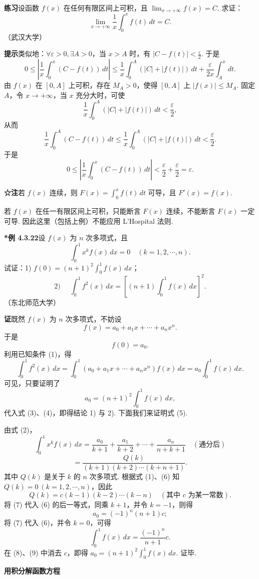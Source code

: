 \documentclass[UTF8, 12pt, fontset=fandol, oneside]{ctexart}
\begin{document}
\noindent\textbf{练习}\quad 设函数 $f(x)$ 在任何有限区间上可积，且 $\lim_{x\to+\infty}f(x)=C$. 求证：
\[
\lim_{x\to+\infty}\frac1x\int_0^x f(t)\,dt=C.
\]
（武汉大学）

\noindent\textbf{提示}\quad 类似地：$\forall\varepsilon>0,\exists A>0$，当 $x>A$ 时，有 $|C-f(t)|<\frac{\varepsilon}{2}$. 于是
\[
0\le\left|\frac1x\int_0^x(C-f(t))\,dt\right|
\le\frac1x\int_0^A(|C|+|f(t)|)\,dt+\frac{\varepsilon}{2x}\int_A^x dt.
\]
由 $f(x)$ 在 $[0,A]$ 上可积，存在 $M_A>0$，使得 $[0,A]$ 上 $|f(x)|\le M_A$. 固定 $A$，令 $x\to+\infty$，当 $x$ 充分大时，可使
\[
\frac1x\int_0^A(|C|+|f(t)|)\,dt<\frac{\varepsilon}{2},
\]
从而
\[
\frac1x\int_0^A(C-f(t))\,dt
\le\frac1x\int_0^A(|C|+|f(t)|)\,dt<\frac{\varepsilon}{2}.
\]
于是
\[
0\le\left|\frac1x\int_0^x(C-f(t))\,dt\right|
<\frac{\varepsilon}{2}+\frac{\varepsilon}{2}=\varepsilon.
\]

\noindent\textbf{☆注}\quad 若 $f(x)$ 连续，则 $F(x)=\int_0^x f(t)\,dt$ 可导，且 $F'(x)=f(x)$.

若 $f(x)$ 在任一有限区间上可积，只能断言 $F(x)$ 连续，不能断言 $F(x)$ 一定可导. 因此这里（包括上例）不能应用 L'Hospital 法则.

\noindent\textbf{*例 4.3.22}\quad 设 $f(x)$ 为 $n$ 次多项式，且
\[
\int_0^1 x^k f(x)\,dx=0\quad(k=1,2,\cdots,n).
\tag{1}
\]
试证：1) $f(0)=(n+1)^2\int_0^1 f(x)\,dx$；
\[
\text{2) }\quad
\int_0^1 f^2(x)\,dx
=\left[(n+1)\int_0^1 f(x)\,dx\right]^2.
\]
（东北师范大学）

\noindent\textbf{证}\quad 既然 $f(x)$ 为 $n$ 次多项式，不妨设
\[
f(x)=a_0+a_1x+\cdots+a_nx^n.
\tag{2}
\]
于是
\[
f(0)=a_0.
\tag{3}
\]
利用已知条件 (1)，得
\[
\int_0^1 f^2(x)\,dx
=\int_0^1(a_0+a_1x+\cdots+a_nx^n)f(x)\,dx
=a_0\int_0^1 f(x)\,dx.
\tag{4}
\]
可见，只要证明了
\[
a_0=(n+1)^2\int_0^1 f(x)\,dx,
\tag{5}
\]
代入式 (3)、(4)，即得结论 1) 与 2). 下面我们来证明式 (5).

由式 (2)，
\[
\int_0^1 x^k f(x)\,dx
=\frac{a_0}{k+1}+\frac{a_1}{k+2}+\cdots+\frac{a_n}{n+k+1}\quad(\text{通分后})
\]
\[
=\frac{Q(k)}{(k+1)(k+2)\cdots(k+n+1)}.
\tag{6}
\]
其中 $Q(k)$ 是关于 $k$ 的 $n$ 次多项式. 根据式 (1)、(6) 知 $Q(k)=0\ (k=1,2,\cdots,n)$，因此
\[
Q(k)=c(k-1)(k-2)\cdots(k-n)\quad(\text{其中 }c\text{ 为某一常数}).
\tag{7}
\]
将 (7) 代入 (6) 的后一等式，同乘 $k+1$，并令 $k=-1$，则得
\[
a_0=(-1)^n(n+1)c;
\tag{8}
\]
将 (7) 代入 (6)，并令 $k=0$，可得
\[
\int_0^1 f(x)\,dx=\frac{(-1)^n}{n+1}c.
\tag{9}
\]
在 (8)、(9) 中消去 $c$，即得 $a_0=(n+1)^2\int_0^1 f(x)\,dx$. 证毕.

\noindent\textbf{用积分解函数方程}
\end{document}
